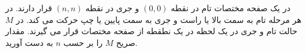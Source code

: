\exercise
در یک صفحه مختصات تام در نقطه
$(0, 0)$
و جری در نقطه
$(n, n)$
قرار دارند. در هر مرحله تام به سمت بالا یا راست و جری به سمت پایین یا چپ حرکت می کند. در
$M$
حالت تام و جری در یک لحظه در یک نطقطه از صفحه مختصات قرار می گیرند. مقدار صریح
$M$
را بر حسب
$n$
به دست آورید.
